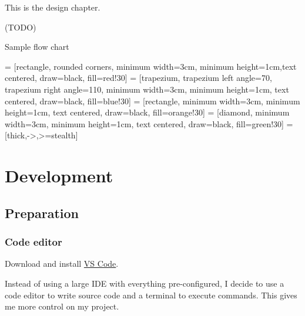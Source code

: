 \documentclass[a4paper]{report}
\begin{document}
This is the design chapter.

(TODO)

Sample flow chart

 = [rectangle, rounded corners, minimum width=3cm, minimum height=1cm,text centered, draw=black, fill=red!30]
 = [trapezium, trapezium left angle=70, trapezium right angle=110, minimum width=3cm, minimum height=1cm, text centered, draw=black, fill=blue!30]
 = [rectangle, minimum width=3cm, minimum height=1cm, text centered, draw=black, fill=orange!30]
 = [diamond, minimum width=3cm, minimum height=1cm, text centered, draw=black, fill=green!30]
 = [thick,->,>=stealth]


\chapter{Development}

\section{Preparation}

\subsection{Code editor}

Download and install \href{https://code.visualstudio.com/}{VS Code}.

Instead of using a large IDE with everything pre-configured, I decide to use a code editor to write source code and a terminal to execute commands. This gives me more control on my project.
\end{document}
